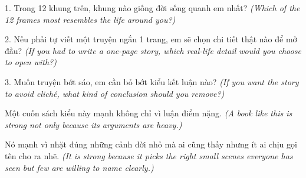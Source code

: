 
\begin{tuhocnhanh}
1. Trong 12 khung trên, khung nào giống đời sống quanh em nhất? \textit{(Which of the 12 frames most resembles the life around you?)}

2. Nếu phải tự viết một truyện ngắn 1 trang, em sẽ chọn chi tiết thật nào để mở đầu? \textit{(If you had to write a one-page story, which real-life detail would you choose to open with?)}

3. Muốn truyện bớt sáo, em cần bỏ bớt kiểu kết luận nào? \textit{(If you want the story to avoid cliché, what kind of conclusion should you remove?)}
\end{tuhocnhanh}

\begin{tongketchuong}
Một cuốn sách kiểu này mạnh không chỉ vì luận điểm nặng.
\textit{(A book like this is strong not only because its arguments are heavy.)}

Nó mạnh vì nhặt đúng những cảnh đời nhỏ mà ai cũng thấy nhưng ít ai chịu gọi tên cho ra nhẽ.
\textit{(It is strong because it picks the right small scenes everyone has seen but few are willing to name clearly.)}
\end{tongketchuong}

\ngancach